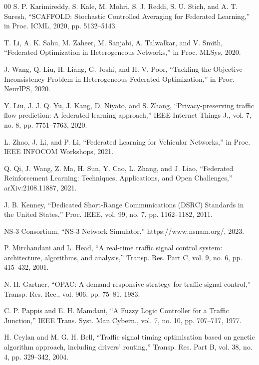 \documentclass[conference]{IEEEtran}
\begin{document}
\begin{thebibliography}{00}
 S. P. Karimireddy, S. Kale, M. Mohri, S. J. Reddi, S. U. Stich, and A. T. Suresh, ``SCAFFOLD: Stochastic Controlled Averaging for Federated Learning,'' in Proc. ICML, 2020, pp. 5132--5143.

 T. Li, A. K. Sahu, M. Zaheer, M. Sanjabi, A. Talwalkar, and V. Smith, ``Federated Optimization in Heterogeneous Networks,'' in Proc. MLSys, 2020.

 J. Wang, Q. Liu, H. Liang, G. Joshi, and H. V. Poor, ``Tackling the Objective Inconsistency Problem in Heterogeneous Federated Optimization,'' in Proc. NeurIPS, 2020.

 Y. Liu, J. J. Q. Yu, J. Kang, D. Niyato, and S. Zhang, ``Privacy-preserving traffic flow prediction: A federated learning approach,'' IEEE Internet Things J., vol. 7, no. 8, pp. 7751--7763, 2020.

 L. Zhao, J. Li, and P. Li, ``Federated Learning for Vehicular Networks,'' in Proc. IEEE INFOCOM Workshops, 2021.

 Q. Qi, J. Wang, Z. Ma, H. Sun, Y. Cao, L. Zhang, and J. Liao, ``Federated Reinforcement Learning: Techniques, Applications, and Open Challenges,'' arXiv:2108.11887, 2021.

 J. B. Kenney, ``Dedicated Short-Range Communications (DSRC) Standards in the United States,'' Proc. IEEE, vol. 99, no. 7, pp. 1162--1182, 2011.

 NS-3 Consortium, ``NS-3 Network Simulator,'' https://www.nsnam.org/, 2023.

 P. Mirchandani and L. Head, ``A real-time traffic signal control system: architecture, algorithms, and analysis,'' Transp. Res. Part C, vol. 9, no. 6, pp. 415--432, 2001.

 N. H. Gartner, ``OPAC: A demand-responsive strategy for traffic signal control,'' Transp. Res. Rec., vol. 906, pp. 75--81, 1983.

 C. P. Pappis and E. H. Mamdani, ``A Fuzzy Logic Controller for a Traffic Junction,'' IEEE Trans. Syst. Man Cybern., vol. 7, no. 10, pp. 707--717, 1977.

 H. Ceylan and M. G. H. Bell, ``Traffic signal timing optimisation based on genetic algorithm approach, including drivers' routing,'' Transp. Res. Part B, vol. 38, no. 4, pp. 329--342, 2004.


\end{thebibliography}
\end{document}
